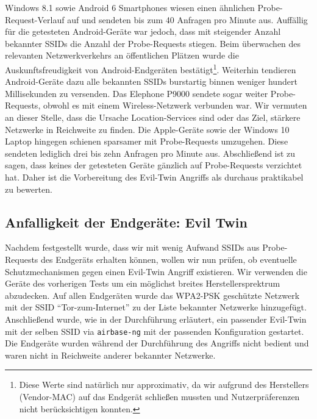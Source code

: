 Windows 8.1 sowie Android 6 Smartphones wiesen einen ähnlichen Probe-Request-Verlauf auf und sendeten bis zum 40 Anfragen pro Minute aus.
Auffällig für die getesteten Android-Geräte war jedoch, dass mit steigender Anzahl bekannter SSIDs die Anzahl der Probe-Requests stiegen.
Beim überwachen des relevanten Netzwerkverkehrs an öffentlichen Plätzen wurde die Auskunftsfreudigkeit von Android-Endgeräten bestätigt\footnote{Diese Werte sind natürlich nur approximativ, da wir aufgrund des Herstellers (Vendor-MAC) auf das Endgerät schließen mussten und Nutzerpräferenzen nicht berücksichtigen konnten.}. %
Weiterhin tendieren Android-Geräte dazu alle bekannten SSIDs burstartig binnen weniger hundert Millisekunden zu versenden.
Das Elephone P9000 sendete sogar weiter Probe-Requests, obwohl es mit einem Wireless-Netzwerk verbunden war.
Wir vermuten an dieser Stelle, dass die Ursache Location-Services sind oder das Ziel, stärkere Netzwerke in Reichweite zu finden.
Die Apple-Geräte sowie der Windows 10 Laptop hingegen schienen sparsamer mit Probe-Requests umzugehen.
Diese sendeten lediglich drei bis zehn Anfragen pro Minute aus.
Abschließend ist zu sagen, dass keines der getesteten Geräte gänzlich auf Probe-Requests verzichtet hat.
Daher ist die Vorbereitung des Evil-Twin Angriffs als durchaus praktikabel zu bewerten.

\subsection{Anfalligkeit der Endgeräte: Evil Twin}
Nachdem festgestellt wurde, dass wir mit wenig Aufwand SSIDs aus Probe-Requests des Endgeräts erhalten können, wollen wir nun prüfen, ob eventuelle Schutzmechanismen gegen einen Evil-Twin Angriff existieren.
Wir verwenden die Geräte des vorherigen Tests um ein möglichst breites Herstellersprektrum abzudecken.
Auf allen Endgeräten wurde das WPA2-PSK geschützte Netzwerk mit der SSID \enquote{Tor-zum-Internet} zu der Liste bekannter Netzwerke hinzugefügt.
Anschließend wurde, wie in der Durchführung erläutert, ein passender Evil-Twin mit der selben SSID via \texttt{airbase-ng} mit der passenden Konfiguration gestartet.
Die Endgeräte wurden während der Durchführung des Angriffs nicht bedient und waren nicht in Reichweite anderer bekannter Netzwerke.

